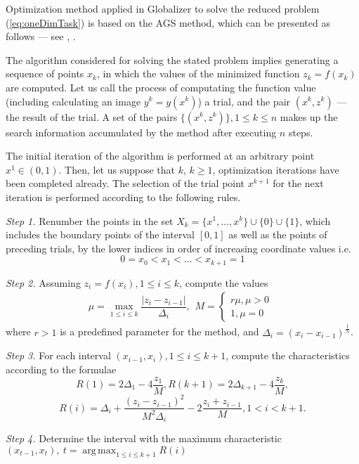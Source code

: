 \documentclass[runningheads]{llncs}
\DeclareMathOperator*{\argmax}{arg\,max}
\begin{document}
Optimization method applied in Globalizer to solve the reduced problem
(\ref{eq:oneDimTask}) is based on the AGS method, which can be presented as follows ---
see \cite{strongin1978}, \cite{strSergGO}.
\par
The algorithm considered for solving the stated problem implies generating
a sequence of points \(x_k\), in which the values of the minimized function \(z_k = f(x_k)\)
are computed. Let us call the process of computating the function value
(including calculating an image \(y^k=y(x^k)\)) a trial, and the pair \((x^k,z^k)\) ---
the result of the trial. A set of the pairs \(\{(x^k,z^k)\}, 1\leqslant k\leqslant n\)
makes up the search information accumulated by the method after executing \(n\) steps.
\par
The initial iteration of the algorithm is performed at an arbitrary point \mbox{\(x^1\in(0,1)\)}.
Then, let us suppose that \(k\), \(k\ge 1\), optimization iterations have been completed already.
The selection of the trial point \(x^{k+1}\) for the next iteration is performed according to the
following rules.

\textit{Step 1.} Renumber the points in the set \(X_k=\{x^1,\dotsc,x^k\}\cup\{0\}\cup\{1\}\),
which includes the boundary points of the interval \([0,1]\) as well as the points of
preceding trials, by the lower indices in order of increasing coordinate values  i.e.
\begin{displaymath}
0=x_0<x_1<\dotsc<x_{k+1}=1
\end{displaymath}
\par
\textit{Step 2.} Assuming \(z_i=f(x_i),1\leqslant i\leqslant k\), compute the values
\begin{equation}
\label{eq:step2}
\mu=\max_{1\leqslant i\leqslant k}\dfrac{|z_i-z_{i-1}|}{\Delta_i},
\begin{matrix}
    M =
    \left\{
    \begin{matrix}
    r\mu,\mu>0 \\
    1,\mu=0
    \end{matrix} \right.
    \end{matrix}
\end{equation}
where \(r>1\) is a predefined parameter for the method, and \(\Delta_i=(x_i-x_{i-1})^\frac{1}{N}\).
\par
\textit{Step 3.} For each interval \((x_{i-1},x_i),1\leqslant i\leqslant k+1\), compute the
characteristics according to the formulae
\begin{equation}
\label{step3_1}
R(1)=2\Delta_1-4\dfrac{z_1}{M},R(k+1)=2\Delta_{k+1}-4\dfrac{z_k}{M},
\end{equation}
\begin{equation}
\label{eq:step3_2}
R(i)=\Delta_i+\dfrac{(z_i-z_{i-1})^2}{M^2\Delta_i}-2\dfrac{z_i+z_{i-1}}{M},1<i<k+1.
\end{equation}
\par
\textit{Step 4.} Determine the interval with the maximum characteristic \((x_{t-1}, x_t),\:t=\argmax_{1\leqslant i \leqslant k+1}R(i)\)
\end{document}
